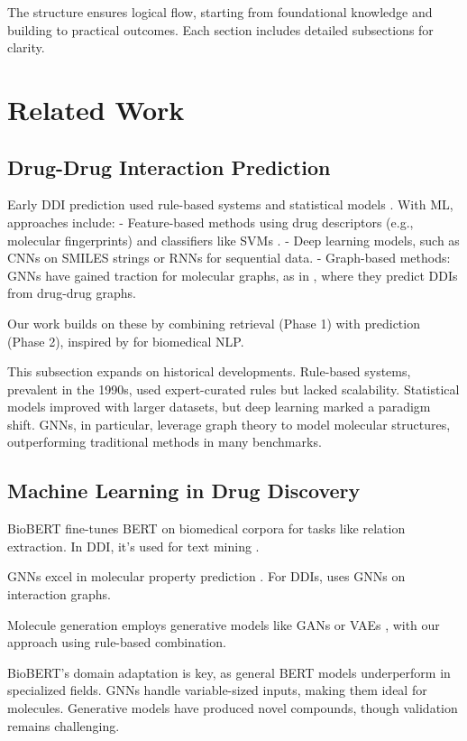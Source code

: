 \documentclass[12pt,a4paper]{article}
\begin{document}
The structure ensures logical flow, starting from foundational knowledge and building to practical outcomes. Each section includes detailed subsections for clarity.

\section{Related Work}
\label{sec:related}

\subsection{Drug-Drug Interaction Prediction}
Early DDI prediction used rule-based systems and statistical models \cite{zhang2017ddi}. With ML, approaches include:
- Feature-based methods using drug descriptors (e.g., molecular fingerprints) and classifiers like SVMs \cite{cheng2017ddi}.
- Deep learning models, such as CNNs on SMILES strings \cite{ryu2018ddi} or RNNs for sequential data.
- Graph-based methods: GNNs have gained traction for molecular graphs, as in \cite{zitnik2018modeling}, where they predict DDIs from drug-drug graphs.

Our work builds on these by combining retrieval (Phase 1) with prediction (Phase 2), inspired by \cite{limsopatham2016biobert} for biomedical NLP.

This subsection expands on historical developments. Rule-based systems, prevalent in the 1990s, used expert-curated rules but lacked scalability. Statistical models improved with larger datasets, but deep learning marked a paradigm shift. GNNs, in particular, leverage graph theory to model molecular structures, outperforming traditional methods in many benchmarks.

\subsection{Machine Learning in Drug Discovery}
BioBERT \cite{lee2020biobert} fine-tunes BERT on biomedical corpora for tasks like relation extraction. In DDI, it's used for text mining \cite{sung2020biobert_ddi}.

GNNs excel in molecular property prediction \cite{gilmer2017neural}. For DDIs, \cite{deac2019drug} uses GNNs on interaction graphs.

Molecule generation employs generative models like GANs or VAEs \cite{segler2018generating}, with our approach using rule-based combination.

BioBERT's domain adaptation is key, as general BERT models underperform in specialized fields. GNNs handle variable-sized inputs, making them ideal for molecules. Generative models have produced novel compounds, though validation remains challenging.
\end{document}
